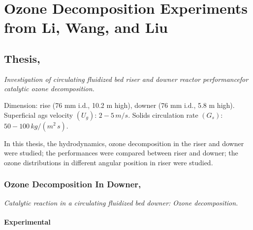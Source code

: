 %
%
%
\chapter{Ozone Decomposition Experiments from Li, Wang, and Liu}
\section[Li, Dongbing, 2010]{Thesis, \cite{li2010}}
\textit{Investigation of circulating fluidized bed riser and downer reactor performancefor catalytic ozone decomposition.}

Dimension: rise (76 mm i.d., 10.2 m high), downer (76 mm i.d., 5.8 m high). Superficial ags velocity $(U_g)$: $2-5\,\si{m/s}$. 
Solids circulation rate $(G_s)$: $50-100\,\si{kg/(m^2\,s)}$.

In this thesis, the hydrodynamics, ozone decomposition in the riser and downer were studied; 
the performances were compared between riser and downer; 
the ozone distributions in different angular position in riser were studied.

\subsection[Ozone Decomposition In Downer, 2011]{Ozone Decomposition In Downer, \cite{li2011catalytic}}
\textit{Catalytic reaction in a circulating ﬂuidized bed downer: Ozone decomposition.}
\subsubsection{Experimental}
